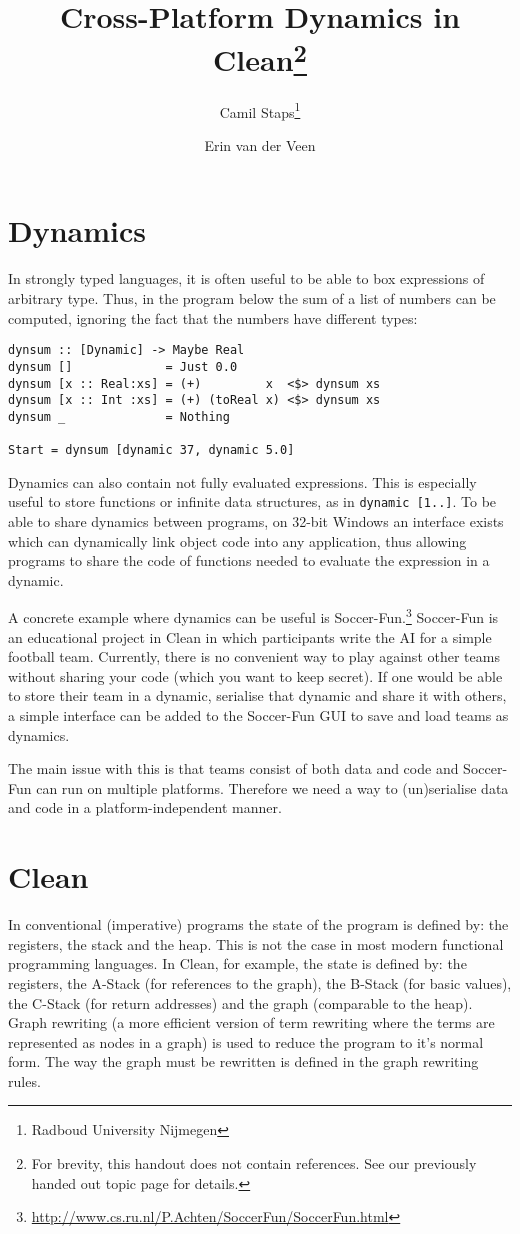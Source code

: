 \documentclass[a4paper]{article}
\title{Cross-Platform Dynamics in Clean\footnote{For brevity, this handout does not contain references. See our previously handed out topic page for details.}}
\author{Camil Staps\footnote{Radboud University Nijmegen} \and Erin van der Veen\footnotemark[2]}
\begin{document}
\maketitle

\section{Dynamics}
In strongly typed languages, it is often useful to be able to box expressions of arbitrary type.
Thus, in the program below the sum of a list of numbers can be computed, ignoring the fact that the numbers have different types:

\begin{verbatim}
dynsum :: [Dynamic] -> Maybe Real
dynsum []             = Just 0.0
dynsum [x :: Real:xs] = (+)         x  <$> dynsum xs
dynsum [x :: Int :xs] = (+) (toReal x) <$> dynsum xs
dynsum _              = Nothing

Start = dynsum [dynamic 37, dynamic 5.0]
\end{verbatim}
%
Dynamics can also contain not fully evaluated expressions.
This is especially useful to store functions or infinite data structures, as in \texttt{dynamic [1..]}.
To be able to share dynamics between programs, on 32-bit Windows an interface exists which can dynamically link object code into any application,
	thus allowing programs to share the code of functions needed to evaluate the expression in a dynamic.

A concrete example where dynamics can be useful is Soccer-Fun.\footnote{\url{http://www.cs.ru.nl/P.Achten/SoccerFun/SoccerFun.html}}
Soccer-Fun is an educational project in Clean in which participants write the AI for a simple football team.
Currently, there is no convenient way to play against other teams without sharing your code (which you want to keep secret).
If one would be able to store their team in a dynamic, serialise that dynamic and share it with others,
	a simple interface can be added to the Soccer-Fun GUI to save and load teams as dynamics.

The main issue with this is that teams consist of both data and code and Soccer-Fun can run on multiple platforms.
Therefore we need a way to (un)serialise data and code in a platform-independent manner.

\section{Clean}
In conventional (imperative) programs the state of the program is defined by: the registers, the stack and the heap.
This is not the case in most modern functional programming languages.
In Clean, for example, the state is defined by: the registers, the A-Stack (for references to the graph), the B-Stack (for basic values), the C-Stack (for return addresses) and the graph (comparable to the heap).
Graph rewriting (a more efficient version of term rewriting where the terms are represented as nodes in a graph) is used to reduce the program to it's normal form.
The way the graph must be rewritten is defined in the graph rewriting rules.
\end{document}
